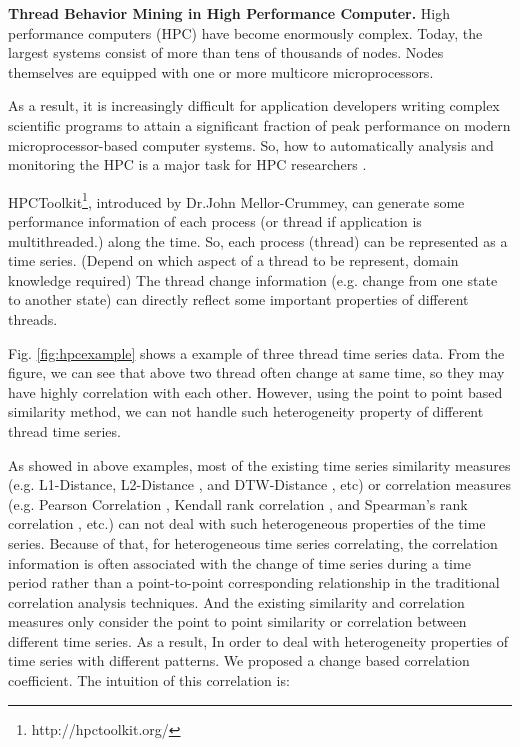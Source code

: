 \textbf{Thread Behavior Mining in High Performance Computer.}
High performance computers (HPC) have become enormously complex. Today, the largest systems consist of more than tens of thousands of nodes. Nodes themselves are equipped with one or more multicore microprocessors\cite{adhianto2010hpctoolkit}.

As a result, it is increasingly difficult for application developers writing complex scientific programs to attain a significant fraction of peak performance on modern microprocessor-based computer systems.
So, how to automatically analysis and monitoring the HPC is a major task for HPC researchers \cite{mccurdy2010memphis,tallent2009effective}.

HPCToolkit\footnote{http://hpctoolkit.org/}, introduced by Dr.John Mellor-Crummey, can generate some performance information of each process (or thread if application is multithreaded.) along the time. So, each process (thread) can be represented as a time series. (Depend on which aspect of a thread to be represent, domain knowledge required) The thread change information (e.g. change from one state to another state) can directly reflect some important properties of different threads.

Fig. \ref{fig:hpcexample} shows a example of three thread time series data. From the figure, we can see that above two thread often change at same time, so they may have highly correlation with each other. However, using the point to point based similarity method, we can not handle such heterogeneity property of different thread time series.


As showed in above examples, most of the existing time series similarity measures (e.g. L1-Distance, L2-Distance \cite{han2011data}, and DTW-Distance \cite{muller2007dynamic}, etc) or correlation measures (e.g. Pearson Correlation \cite{pearson1904mathematical}, Kendall rank correlation \cite{kendall1938new}, and Spearman's rank correlation \cite{pirie1988spearman}, etc.) can not deal with such heterogeneous properties of the time series.
Because of that, for heterogeneous time series correlating, the correlation information is often associated with the change of time series during a time period rather than a point-to-point corresponding relationship in the traditional correlation analysis techniques.
And the existing similarity and correlation measures only consider the point to point similarity or correlation between different time series.
As a result, In order to deal with heterogeneity properties of time series with different patterns.
We proposed a change based correlation coefficient.
The intuition of this correlation is:


